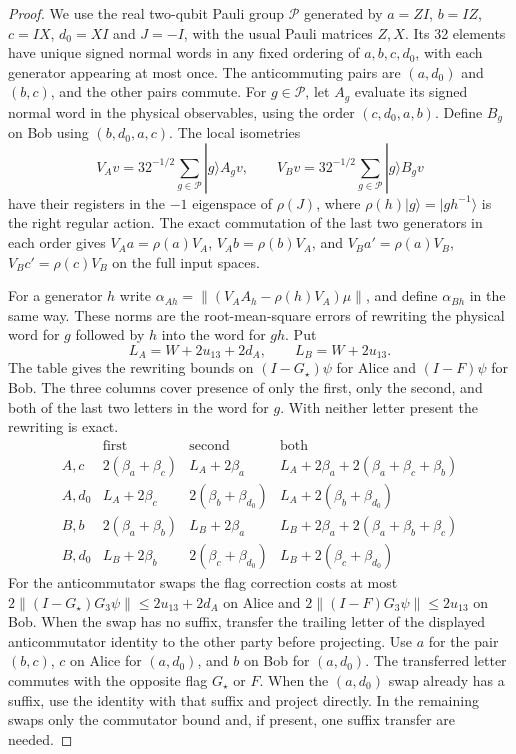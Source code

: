 \begin{proof}
We use the real two-qubit Pauli group $\mathcal P$ generated by
$a=ZI$, $b=IZ$, $c=IX$, $d_0=XI$ and $J=-I$, with the usual Pauli
matrices $Z,X$. Its 32 elements have unique signed normal words in any
fixed ordering of $a,b,c,d_0$, with each generator appearing at most once.
The anticommuting pairs are $(a,d_0)$ and $(b,c)$, and the other pairs
commute. For $g\in\mathcal P$, let $A_g$ evaluate its signed normal word
in the physical observables, using the order $(c,d_0,a,b)$. Define
$B_g$ on Bob using $(b,d_0,a,c)$. The local isometries
\[
 V_A v=32^{-1/2}\sum_{g\in\mathcal P}|g\rangle A_g v,\qquad
 V_B v=32^{-1/2}\sum_{g\in\mathcal P}|g\rangle B_g v
\]
have their registers in the $-1$ eigenspace of $\rho(J)$, where
$\rho(h)|g\rangle=|gh^{-1}\rangle$ is the right regular action.
The exact commutation of the last two generators in each order gives
$V_A a=\rho(a)V_A$, $V_A b=\rho(b)V_A$, and
$V_B a'=\rho(a)V_B$, $V_B c'=\rho(c)V_B$ on the full input spaces.

For a generator $h$ write $\alpha_{Ah}=\|(V_A A_h-\rho(h)V_A)\mu\|$,
and define $\alpha_{Bh}$ in the same way. These norms are the
root-mean-square errors of rewriting the physical word for $g$
followed by $h$ into the word for $gh$. Put
\[
 L_A=W+2u_{13}+2d_A,\qquad L_B=W+2u_{13}.
\]
The table gives the rewriting bounds on $(I-G_\star)\psi$ for Alice and
$(I-F)\psi$ for Bob. The three columns cover presence of only the
first, only the second, and both of the last two letters in the word
for $g$. With neither letter present the rewriting is exact.
\[
\begin{array}{c|ccc}
 &\text{first}&\text{second}&\text{both}\\ \hline
 A,c
 &2(\beta_a+\beta_c)& L_A+2\beta_a
 & L_A+2\beta_a+2(\beta_a+\beta_c+\beta_b)\\
 A,d_0
 &L_A+2\beta_c&2(\beta_b+\beta_{d_0})
 &L_A+2(\beta_b+\beta_{d_0})\\
 B,b
 &2(\beta_a+\beta_b)&L_B+2\beta_a
 &L_B+2\beta_a+2(\beta_a+\beta_b+\beta_c)\\
 B,d_0
 &L_B+2\beta_b&2(\beta_c+\beta_{d_0})
 &L_B+2(\beta_c+\beta_{d_0})
\end{array}
\]
For the anticommutator swaps the flag correction costs at most
$2\|(I-G_\star)G_3\psi\|\le2u_{13}+2d_A$ on Alice and
$2\|(I-F)G_3\psi\|\le2u_{13}$ on Bob. When the swap has no suffix,
transfer the trailing letter of the displayed anticommutator identity
to the other party before projecting. Use $a$ for the pair $(b,c)$, $c$
on Alice for $(a,d_0)$, and $b$ on Bob for $(a,d_0)$. The transferred
letter commutes with the opposite flag $G_\star$ or $F$. When the
$(a,d_0)$ swap already has a suffix, use the identity with that suffix
and project directly. In the remaining swaps only the commutator
bound and, if present, one suffix transfer are needed.


\end{proof}
